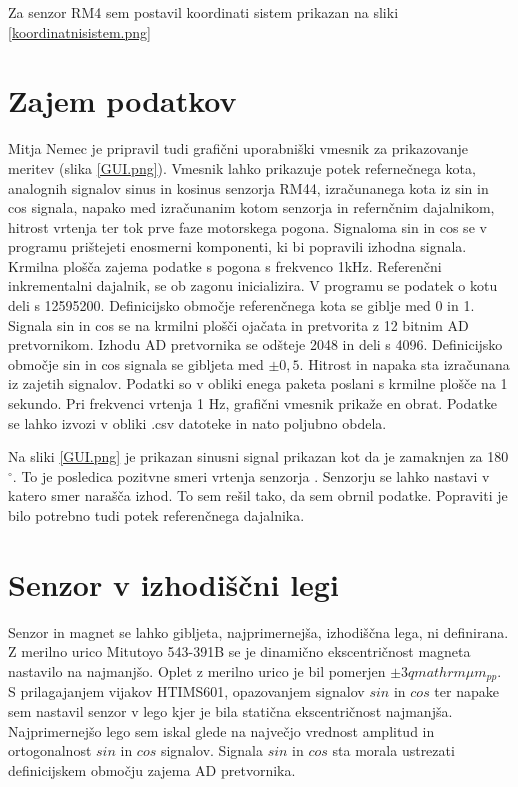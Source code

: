Za senzor RM4 sem postavil koordinati sistem prikazan na sliki \ref{koordinatnisistem.png}
 

\newpage
\section{Zajem podatkov}

Mitja Nemec je pripravil tudi grafični uporabniški vmesnik za prikazovanje meritev (slika \ref{GUI.png}).
Vmesnik lahko prikazuje potek refernečnega kota, analognih signalov sinus in kosinus senzorja RM44, izračunanega kota iz sin in cos signala, napako med izračunanim kotom senzorja in refernčnim dajalnikom, hitrost vrtenja ter tok prve faze motorskega pogona. Signaloma sin in cos se v programu prištejeti enosmerni komponenti, ki bi popravili izhodna signala.
Krmilna plošča zajema podatke s pogona s frekvenco 1kHz.
Referenčni inkrementalni dajalnik, se ob zagonu inicializira. V programu se podatek o kotu deli s 12595200. Definicijsko območje referenčnega kota se giblje med 0 in 1.
Signala sin in cos se na krmilni plošči ojačata in pretvorita z 12 bitnim AD pretvornikom. Izhodu AD pretvornika se odšteje 2048 in deli s 4096. Definicijsko območje sin in cos signala se gibljeta med $\pm0,5$.
Hitrost in napaka sta izračunana iz zajetih signalov.
Podatki so v obliki enega paketa poslani s krmilne plošče na 1 sekundo. Pri frekvenci vrtenja 1 Hz, grafični vmesnik prikaže en obrat.
Podatke se lahko izvozi v obliki .csv datoteke in nato poljubno obdela.

Na sliki  \ref{GUI.png} je prikazan sinusni signal prikazan kot da je zamaknjen za 180$\mathrm{^\circ}$. To je posledica pozitvne smeri vrtenja senzorja \cite{RM44}. Senzorju se lahko nastavi v katero smer narašča izhod. To sem rešil tako, da sem obrnil podatke. Popraviti je bilo potrebno tudi potek referenčnega dajalnika.
\section{Senzor v izhodiščni legi}
Senzor in magnet se lahko gibljeta, najprimernejša, izhodiščna lega, ni definirana. Z merilno urico Mitutoyo 543-391B se je dinamično ekscentričnost magneta nastavilo na najmanjšo. Oplet z merilno urico je bil pomerjen $\pm 3 qmathrm{\mu m_{pp}}$.
S prilagajanjem vijakov HTIMS601, opazovanjem signalov $sin$ in $cos$ ter napake sem nastavil senzor v lego kjer je bila statična ekscentričnost najmanjša. Najprimernejšo lego sem iskal glede na največjo vrednost amplitud in ortogonalnost  $sin$ in $cos$ signalov. Signala $sin$ in $cos$ sta morala ustrezati definicijskem območju zajema AD pretvornika.



